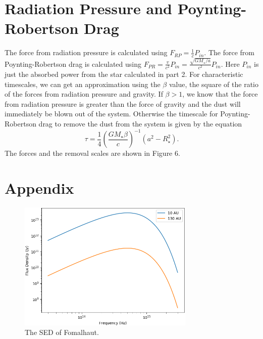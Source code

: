 \documentclass[12pt]{article}
\begin{document}
\section{Radiation Pressure and Poynting-Robertson Drag}

The force from radiation pressure is calculated using $F_{RP} = \frac{1}{c}P_{in}$. The force from Poynting-Robertson drag is calculated using $F_{PR} = \frac{v}{c^{2}}P_{in} = \frac{\sqrt{GM_{\star}/a}}{c^{2}}P_{in}$. Here $P_{in}$ is just the absorbed power from the star calculated in part 2. For characteristic timescales, we can get an approximation using the $\beta$ value, the square of the ratio of the forces from radiation pressure and gravity. If $\beta > 1$, we know that the force from radiation pressure is greater than the force of gravity and the dust will immediately be blown out of the system. Otherwise the timescale for Poynting-Robertson drag to remove the dust from the system is given by the equation \cite{timescale} $$\tau = \frac{1}{4}\left(\frac{GM_{\star}\beta}{c}\right)^{-1}\left(a^{2}-R_{\star}^{2}\right).$$ The forces and the removal scales are shown in Figure 6.





\section*{Appendix}
\vspace{-1em}
\begin{figure}[H]
\centering
\includegraphics[width=0.75\textwidth]{star.png}
\vspace{-0.5em}
\caption{The SED of Fomalhaut.}
\end{figure}
\end{document}
